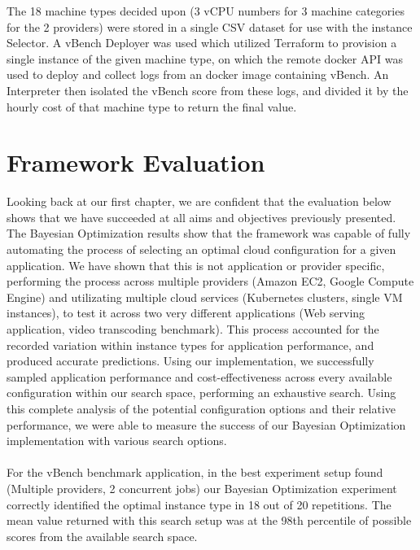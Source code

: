 \documentclass{report}
\begin{document}
The 18 machine types decided upon (3 vCPU numbers for 3 machine categories for the 2 providers) were stored in a single CSV dataset for use with the instance Selector. A vBench Deployer was used which utilized Terraform to provision a single instance of the given machine type, on which the remote docker API was used to deploy and collect logs from an docker image containing vBench. An Interpreter then isolated the vBench score from these logs, and divided it by the hourly cost of that machine type to return the final value.

\section{Framework Evaluation}
Looking back at our first chapter, we are confident that the evaluation below shows that we have succeeded at all aims and objectives previously presented. The Bayesian Optimization results show that the framework was capable of fully automating the process of selecting an optimal cloud configuration for a given application. We have shown that this is not application or provider specific, performing the process across multiple providers (Amazon EC2, Google Compute Engine) and utilizating multiple cloud services (Kubernetes clusters, single VM instances), to test it across two very different applications (Web serving application, video transcoding benchmark). This process accounted for the recorded variation within instance types for application performance, and produced accurate predictions. Using our implementation, we successfully sampled application performance and cost-effectiveness across every available configuration within our search space, performing an exhaustive search. Using this complete analysis of the potential configuration options and their relative performance, we were able to measure the success of our Bayesian Optimization implementation with various search options.

\paragraph{}

For the vBench benchmark application, in the best experiment setup found (Multiple providers, 2 concurrent jobs) our Bayesian Optimization experiment correctly identified the optimal instance type in 18 out of 20 repetitions. The mean value returned with this search setup was at the 98th percentile of possible scores from the available search space.
\end{document}
